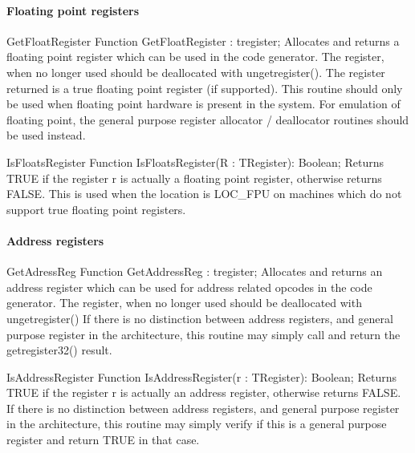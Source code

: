 \documentclass [a4paper,12pt]{article}
\begin{document}
\paragraph{Floating point registers}

\begin{function}{GetFloatRegister}
\Declaration
Function GetFloatRegister : tregister;
\Description
Allocates and returns a floating point register which can be used in the
code generator. The register, when no longer used should be deallocated with
ungetregister(). The register returned is a true floating point register (if
supported).
\Notes
This routine should only be used when floating point hardware is present in
the system. For emulation of floating point, the general purpose register
allocator / deallocator routines should be used instead.
\end{function}

\begin{function}{IsFloatsRegister}
\Declaration
Function IsFloatsRegister(R : TRegister): Boolean;
\Description
Returns TRUE if the register r is actually a floating point register,
otherwise returns FALSE. This is used when the location is LOC{\_}FPU on
machines which do not support true floating point registers.
\end{function}

\paragraph{Address registers}

\begin{function}{GetAdressReg}
\Declaration
Function GetAddressReg : tregister;
\Description
Allocates and returns an address register which can be used for address
related opcodes in the code generator. The register, when no longer used
should be deallocated with ungetregister()
\Notes
If there is no distinction between address registers, and general purpose
register in the architecture, this routine may simply call and return the
getregister32() result.
\end{function}

\begin{function}{IsAddressRegister}
\Declaration
Function IsAddressRegister(r : TRegister): Boolean;
\Description
Returns TRUE if the register r is actually an address register, otherwise
returns FALSE.
\Notes
If there is no distinction between address registers, and general purpose
register in the architecture, this routine may simply verify if this is a
general purpose register and return TRUE in that case.
\end{function}
\end{document}
